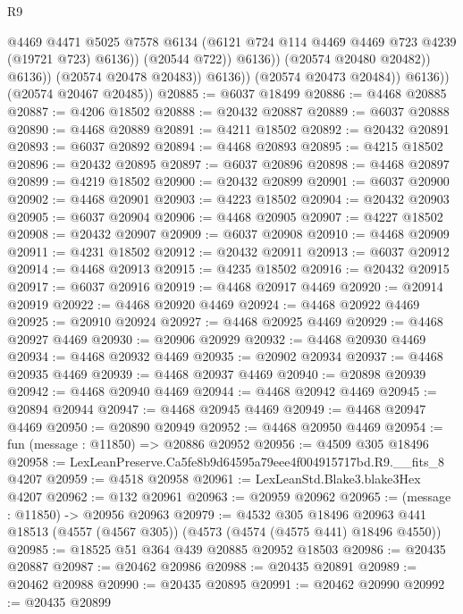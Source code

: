 \begin{lexlean}{R9}
\begin{coremodule}
                                @4469
                                @4471
                                @5025
                                @7578
                                @6134
                                (@6121 @724 @114 @4469 @4469 @723 @4239 (@19721 @723) @6136))
                              (@20544 @722))
                            @6136))
                        (@20574 @20480 @20482))
                      @6136))
                  (@20574 @20478 @20483))
                @6136))
            (@20574 @20473 @20484))
          @6136))
      (@20574 @20467 @20485))
@20885 := @6037 @18499
@20886 := @4468 @20885
@20887 := @4206 @18502
@20888 := @20432 @20887
@20889 := @6037 @20888
@20890 := @4468 @20889
@20891 := @4211 @18502
@20892 := @20432 @20891
@20893 := @6037 @20892
@20894 := @4468 @20893
@20895 := @4215 @18502
@20896 := @20432 @20895
@20897 := @6037 @20896
@20898 := @4468 @20897
@20899 := @4219 @18502
@20900 := @20432 @20899
@20901 := @6037 @20900
@20902 := @4468 @20901
@20903 := @4223 @18502
@20904 := @20432 @20903
@20905 := @6037 @20904
@20906 := @4468 @20905
@20907 := @4227 @18502
@20908 := @20432 @20907
@20909 := @6037 @20908
@20910 := @4468 @20909
@20911 := @4231 @18502
@20912 := @20432 @20911
@20913 := @6037 @20912
@20914 := @4468 @20913
@20915 := @4235 @18502
@20916 := @20432 @20915
@20917 := @6037 @20916
@20919 := @4468 @20917 @4469
@20920 := @20914 @20919
@20922 := @4468 @20920 @4469
@20924 := @4468 @20922 @4469
@20925 := @20910 @20924
@20927 := @4468 @20925 @4469
@20929 := @4468 @20927 @4469
@20930 := @20906 @20929
@20932 := @4468 @20930 @4469
@20934 := @4468 @20932 @4469
@20935 := @20902 @20934
@20937 := @4468 @20935 @4469
@20939 := @4468 @20937 @4469
@20940 := @20898 @20939
@20942 := @4468 @20940 @4469
@20944 := @4468 @20942 @4469
@20945 := @20894 @20944
@20947 := @4468 @20945 @4469
@20949 := @4468 @20947 @4469
@20950 := @20890 @20949
@20952 := @4468 @20950 @4469
@20954 := fun (message : @11850) => @20886 @20952
@20956 := @4509 @305 @18496
@20958 := LexLeanPreserve.Ca5fe8b9d64595a79eee4f004915717bd.R9.__fits_8 @4207
@20959 := @4518 @20958
@20961 := LexLeanStd.Blake3.blake3Hex @4207
@20962 := @132 @20961
@20963 := @20959 @20962
@20965 := (message : @11850) -> @20956 @20963
@20979 := @4532
    @305
    @18496
    @20963
    @441
    @18513
    (@4557 (@4567 @305))
    (@4573 (@4574 (@4575 @441) @18496 @4550))
@20985 := @18525 @51 @364 @439 @20885 @20952 @18503
@20986 := @20435 @20887
@20987 := @20462 @20986
@20988 := @20435 @20891
@20989 := @20462 @20988
@20990 := @20435 @20895
@20991 := @20462 @20990
@20992 := @20435 @20899

\end{coremodule}
\end{lexlean}
